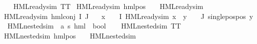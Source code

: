 \begin{isabellebody}
\ \ \isanewline
{\isachardoublequoteopen}HML{\isacharunderscore}{\kern0pt}ready{\isacharunderscore}{\kern0pt}sim\ TT{\isachardoublequoteclose}\ {\isacharbar}{\kern0pt}\isanewline
{\isachardoublequoteopen}HML{\isacharunderscore}{\kern0pt}ready{\isacharunderscore}{\kern0pt}sim\ {\isacharparenleft}{\kern0pt}hml{\isacharunderscore}{\kern0pt}pos\ {\isasymalpha}\ {\isasymphi}{\isacharparenright}{\kern0pt}{\isachardoublequoteclose}\ \ {\isachardoublequoteopen}HML{\isacharunderscore}{\kern0pt}ready{\isacharunderscore}{\kern0pt}sim\ {\isasymphi}{\isachardoublequoteclose}\ {\isacharbar}{\kern0pt}\isanewline
{\isachardoublequoteopen}HML{\isacharunderscore}{\kern0pt}ready{\isacharunderscore}{\kern0pt}sim\ {\isacharparenleft}{\kern0pt}hml{\isacharunderscore}{\kern0pt}conj\ I\ J\ {\isasymPhi}{\isacharparenright}{\kern0pt}{\isachardoublequoteclose}\ \ \isanewline
{\isachardoublequoteopen}{\isacharparenleft}{\kern0pt}{\isasymforall}x\ {\isasymin}\ {\isacharparenleft}{\kern0pt}{\isasymPhi}\ {\isacharbackquote}{\kern0pt}\ I{\isacharparenright}{\kern0pt}{\isachardot}{\kern0pt}\ HML{\isacharunderscore}{\kern0pt}ready{\isacharunderscore}{\kern0pt}sim\ x{\isacharparenright}{\kern0pt}\ {\isasymand}\ {\isacharparenleft}{\kern0pt}{\isasymforall}y\ {\isasymin}\ {\isacharparenleft}{\kern0pt}{\isasymPhi}\ {\isacharbackquote}{\kern0pt}\ J{\isacharparenright}{\kern0pt}{\isachardot}{\kern0pt}\ single{\isacharunderscore}{\kern0pt}pos{\isacharunderscore}{\kern0pt}pos\ y{\isacharparenright}{\kern0pt}{\isachardoublequoteclose}\isanewline
\isanewline
{}\isamarkupfalse%
\ HML{\isacharunderscore}{\kern0pt}{}{\isacharunderscore}{\kern0pt}nested{\isacharunderscore}{\kern0pt}sim\ {\isacharcolon}{\kern0pt}{\isacharcolon}{\kern0pt}\ {\isachardoublequoteopen}{\isacharparenleft}{\kern0pt}{\isacharprime}{\kern0pt}a{\isacharcomma}{\kern0pt}\ {\isacharprime}{\kern0pt}s{\isacharparenright}{\kern0pt}\ hml\ {\isasymRightarrow}\ bool{\isachardoublequoteclose}\ \isanewline
\ \ \isanewline
{\isachardoublequoteopen}HML{\isacharunderscore}{\kern0pt}{}{\isacharunderscore}{\kern0pt}nested{\isacharunderscore}{\kern0pt}sim\ TT{\isachardoublequoteclose}\ {\isacharbar}{\kern0pt}\isanewline
{\isachardoublequoteopen}HML{\isacharunderscore}{\kern0pt}{}{\isacharunderscore}{\kern0pt}nested{\isacharunderscore}{\kern0pt}sim\ {\isacharparenleft}{\kern0pt}hml{\isacharunderscore}{\kern0pt}pos\ {\isasymalpha}\ {\isasymphi}{\isacharparenright}{\kern0pt}{\isachardoublequoteclose}\ \ {\isachardoublequoteopen}HML{\isacharunderscore}{\kern0pt}{}{\isacharunderscore}{\kern0pt}nested{\isacharunderscore}{\kern0pt}sim\ {\isasymphi}{\isachardoublequoteclose}\ {\isacharbar}{\kern0pt}\isanewline

\end{isabellebody}
